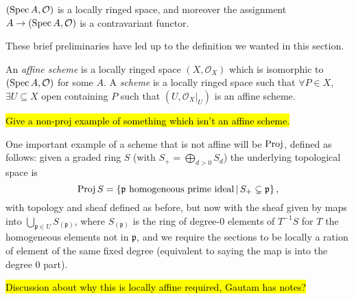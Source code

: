 \documentclass[000-main.tex]{subfiles}
\begin{document}
\begin{example}
  $(\operatorname{Spec} A, \mathcal{O})$ is a locally ringed space, and moreover the assignment $A \to (\operatorname{Spec} A , \mathcal{O})$ is a contravariant functor.
\end{example}

These brief preliminaries have led up to the definition we wanted in this section. 

\begin{definition}
  An \emph{affine scheme} is a locally ringed space $(X, \mathcal{O}_X)$ which is isomorphic to $(\operatorname{Spec} A, \mathcal{O})$ for some $A$.
  A \emph{scheme} is a locally ringed space such that $\forall P \in X$, $\exists U \subseteq X$ open containing $P$ such that $(U, \left . \mathcal{O}_X \right \rvert_{U})$ is an affine scheme.
\end{definition}

\begin{example}
  \hl{Give a non-proj example of something which isn't an affine scheme.}
\end{example}

One important example of a scheme that is not affine will be $\operatorname{Proj}$, defined as follows: given a graded ring $S$ (with $S_+ = \bigoplus_{d > 0 } S_d$) the underlying topological space is 
\[
  \operatorname{Proj} S = \left \lbrace \mathfrak{p} \text{ homogeneous prime ideal} \, | \, S_+ \subsetneq \mathfrak{p} \right \rbrace ,
\] 
with topology and sheaf defined as before, but now with the sheaf given by maps into $\bigcup_{\mathfrak{p} \in U} S_{(\mathfrak{p})}$, where $S_{(\mathfrak{p})}$ is the ring of degree-0 elements of $T^{-1}S$ for $T$ the homogeneous elements not in $\mathfrak{p}$, and we require the sections to be locally a ration of element of the same fixed degree (equivalent to saying the map is into the degree 0 part). 

\hl{Discussion about why this is locally affine required, Gautam has notes?} 
\end{document}
